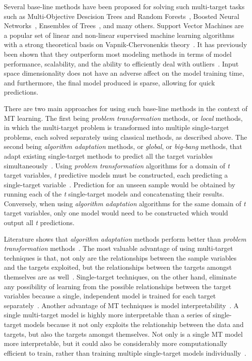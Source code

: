 \documentclass[preprint,12pt]{elsarticle}
\begin{document}
Several base-line methods have been proposed for solving such multi-target tasks such as Multi-Objective Descision Trees and Random Forests~\cite{Kocev2010}, Boosted Neural Networks~\cite{Hadavandi2015-2}, Ensembles of Trees~\cite{Kocev2013}, and many others. Support Vector Machines are a popular set of linear and non-linear supervised machine learning algorithms with a strong theoretical basis on Vapnik-Chervonenkis theory~\cite{Vapnik1995}. It has previously been shown that they outperform most modeling methods in terms of model performance, scalability, and the ability to efficiently deal with outliers~\cite{Kecman, Drucker1997}. Input space dimensionality does not have an adverse affect on the model training time, and furthermore, the final model produced is sparse, allowing for quick predictions.

There are two main approaches for using such base-line methods in the context of MT learning. The first being \textit{problem transformation} methods, or \textit{local} methods, in which the multi-target problem is transformed into multiple single-target problems, each solved separately using classical methods, as described above. The second being \textit{algorithm adaptation} methods, or \textit{global}, or \textit{big-bang} methods, that adapt existing single-target methods to predict all the target variables simultaneously~\cite{Borchani2015,Kocev2015}.
Using \textit{problem transformation} algorithms for a domain of \textit{t} target variables, \textit{t} predictive models must be constructed, each predicting a single-target variable~\cite{Kocev2015}. Prediction for an unseen sample would be obtained by running each of the \textit{t} single-target models and concatenating their results. Conversely, when using \textit{algorithm adaptation} algorithms for the same domain of \textit{t} target variables, only one model would need to be constructed which would output all \textit{t} predictions.

Literature shows that \textit{algorithm adaptation} methods perform better than \textit{problem transformation} methods~\cite{Kocev2015,Spyromitros2014}. The most valuable advantage of using multi-target techniques is that, not only are the relationships between the sample variables and the targets exploited, but the relationships between the targets amongst themselves are as well~\cite{Baxter1997,Caruana1997}. Single-target techniques, on the other hand, eliminate any possibility of learning from the possible relationships between the target variables because a single, independent model is trained for each target separately~\cite{BenDavic2003}. Another advantage of MT techniques is model interpretability~\cite{Aho2012,Xiong2014}. A single multi-target model is highly more interpretable than a series of single-target models because it not only exploits the relationship between the data and targets, but also the targets amongst themselves. Not only is a single MT model more interpretable, but it could also be considerably more computationally efficient to train, rather than training multiple single-target models individually~\cite{Appice2014}. 
\end{document}
